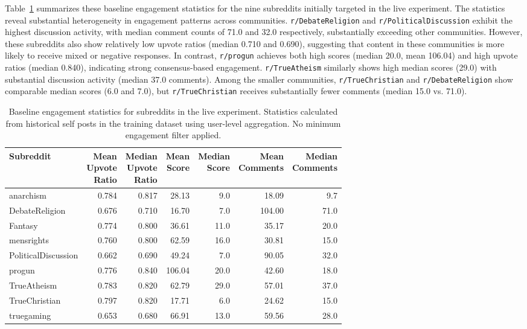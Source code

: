 Table~\ref{tab:baseline_subreddit_stats} summarizes these baseline engagement statistics for the nine subreddits initially targeted in the live experiment. The statistics reveal substantial heterogeneity in engagement patterns across communities. \verb!r/DebateReligion! and \verb!r/PoliticalDiscussion! exhibit the highest discussion activity, with median comment counts of 71.0 and 32.0 respectively, substantially exceeding other communities. However, these subreddits also show relatively low upvote ratios (median 0.710 and 0.690), suggesting that content in these communities is more likely to receive mixed or negative responses. In contrast, \verb!r/progun! achieves both high scores (median 20.0, mean 106.04) and high upvote ratios (median 0.840), indicating strong consensus-based engagement. \verb!r/TrueAtheism! similarly shows high median scores (29.0) with substantial discussion activity (median 37.0 comments). Among the smaller communities, \verb!r/TrueChristian! and \verb!r/DebateReligion! show comparable median scores (6.0 and 7.0), but \verb!r/TrueChristian! receives substantially fewer comments (median 15.0 vs. 71.0).

\begin{table}[htbp]
\centering
\caption{Baseline engagement statistics for subreddits in the live experiment. Statistics calculated from historical self posts in the training dataset using user-level aggregation. No minimum engagement filter applied.}
\label{tab:baseline_subreddit_stats}
\begin{tabular}{lrrrrrr}
\toprule
Subreddit & \makecell{Mean\\Upvote\\Ratio} & \makecell{Median\\Upvote\\Ratio} & \makecell{Mean\\Score} & \makecell{Median\\Score} & \makecell{Mean\\Comments} & \makecell{Median\\Comments} \\
\midrule
anarchism & 0.784 & 0.817 & 28.13 & 9.0 & 18.09 & 9.7 \\
DebateReligion & 0.676 & 0.710 & 16.70 & 7.0 & 104.00 & 71.0 \\
Fantasy & 0.774 & 0.800 & 36.61 & 11.0 & 35.17 & 20.0 \\
mensrights & 0.760 & 0.800 & 62.59 & 16.0 & 30.81 & 15.0 \\
PoliticalDiscussion & 0.662 & 0.690 & 49.24 & 7.0 & 90.05 & 32.0 \\
progun & 0.776 & 0.840 & 106.04 & 20.0 & 42.60 & 18.0 \\
TrueAtheism & 0.783 & 0.820 & 62.79 & 29.0 & 57.01 & 37.0 \\
TrueChristian & 0.797 & 0.820 & 17.71 & 6.0 & 24.62 & 15.0 \\
truegaming & 0.653 & 0.680 & 66.91 & 13.0 & 59.56 & 28.0 \\
\bottomrule
\end{tabular}
\end{table}

